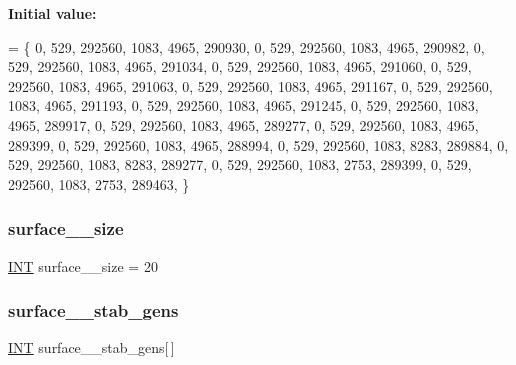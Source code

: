 {\bfseries Initial value\+:}
\begin{DoxyCode}
= \{ 
    0, 529, 292560, 1083, 4965, 290930, 
    0, 529, 292560, 1083, 4965, 290982, 
    0, 529, 292560, 1083, 4965, 291034, 
    0, 529, 292560, 1083, 4965, 291060, 
    0, 529, 292560, 1083, 4965, 291063, 
    0, 529, 292560, 1083, 4965, 291167, 
    0, 529, 292560, 1083, 4965, 291193, 
    0, 529, 292560, 1083, 4965, 291245, 
    0, 529, 292560, 1083, 4965, 289917, 
    0, 529, 292560, 1083, 4965, 289277, 
    0, 529, 292560, 1083, 4965, 289399, 
    0, 529, 292560, 1083, 4965, 288994, 
    0, 529, 292560, 1083, 8283, 289884, 
    0, 529, 292560, 1083, 8283, 289277, 
    0, 529, 292560, 1083, 2753, 289399, 
    0, 529, 292560, 1083, 2753, 289463, 
\}
\end{DoxyCode}
\mbox{\label{surface__23_8_c_acbcd3c9b8b7b8ef99f2d7d9d94236f54}} 
\subsubsection{\texorpdfstring{surface\+\_\+\_\+size}{surface\_23\_size}}
{\footnotesize\ttfamily \mbox{\hyperlink{galois_8h_a09fddde158a3a20bd2dcadb609de11dc}{I\+NT}} surface\+\_\+\_\+size = 20}

\mbox{\label{surface__23_8_c_a96ab57737816ae942e2e890d6c33e7b0}} 
\subsubsection{\texorpdfstring{surface\+\_\+\_\+stab\+\_\+gens}{surface\_23\_stab\_gens}}
{\footnotesize\ttfamily \mbox{\hyperlink{galois_8h_a09fddde158a3a20bd2dcadb609de11dc}{I\+NT}} surface\+\_\+\_\+stab\+\_\+gens\mbox{[}$\,$\mbox{]}}

\mbox{\label{surface__23_8_c_a2b241e67276b4e521f4ad0196d6a0ba1}} 
